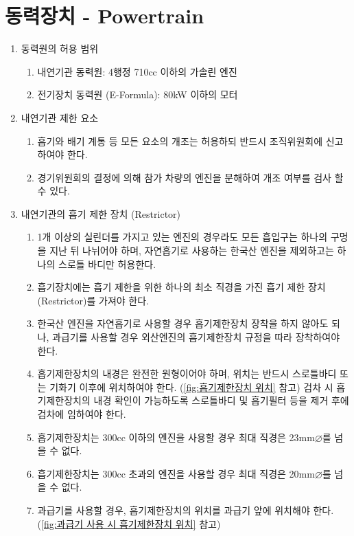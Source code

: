 \documentclass[final,a4paper,10pt]{report}
\begin{document}
\section{동력장치 - Powertrain} \label{section:동력장치}
\begin{enumerate}
  \item 동력원의 허용 범위
    \begin{enumerate}
      \item 내연기관 동력원: 4행정 710cc 이하의 가솔린 엔진
      \item 전기장치 동력원 (E-Formula): 80kW 이하의 모터
    \end{enumerate}
    
  \item 내연기관 제한 요소
    \begin{enumerate}
      \item 흡기와 배기 계통 등 모든 요소의 개조는 허용하되 반드시 조직위원회에 신고하여야 한다.
      \item 경기위원회의 결정에 의해 참가 차량의 엔진을 분해하여 개조 여부를 검사 할 수 있다.
    \end{enumerate}
    
  \item 내연기관의 흡기 제한 장치 (Restrictor)
    \begin{enumerate}
      \item 1개 이상의 실린더를 가지고 있는 엔진의 경우라도 모든 흡입구는 하나의 구멍을 지난 뒤 나뉘어야 하며, 자연흡기로 사용하는 한국산 엔진을 제외하고는 하나의 스로틀 바디만 허용한다.
      \item 흡기장치에는 흡기 제한을 위한 하나의 최소 직경을 가진 흡기 제한 장치(Restrictor)를 가져야 한다.
      \item 한국산 엔진을 자연흡기로 사용할 경우 흡기제한장치 장착을 하지 않아도 되나, 과급기를 사용할 경우 외산엔진의 흡기제한장치 규정을 따라 장착하여야 한다.
      \item 흡기제한장치의 내경은 완전한 원형이어야 하며, 위치는 반드시 스로틀바디 또는 기화기 이후에 위치하여야 한다. (\cref{fig:흡기제한장치 위치} 참고) 검차 시 흡기제한장치의 내경 확인이 가능하도록 스로틀바디 및 흡기필터 등을 제거 후에 검차에 임하여야 한다.
      \item 흡기제한장치는 300cc 이하의 엔진을 사용할 경우 최대 직경은 23mm$\varnothing$를 넘을 수 없다.
      \item 흡기제한장치는 300cc 초과의 엔진을 사용할 경우 최대 직경은 20mm$\varnothing$를 넘을 수 없다.
      \item 과급기를 사용할 경우, 흡기제한장치의 위치를 과급기 앞에 위치해야 한다. (\cref{fig:과급기 사용 시 흡기제한장치 위치} 참고)
    \end{enumerate}


\end{enumerate}
\end{document}
